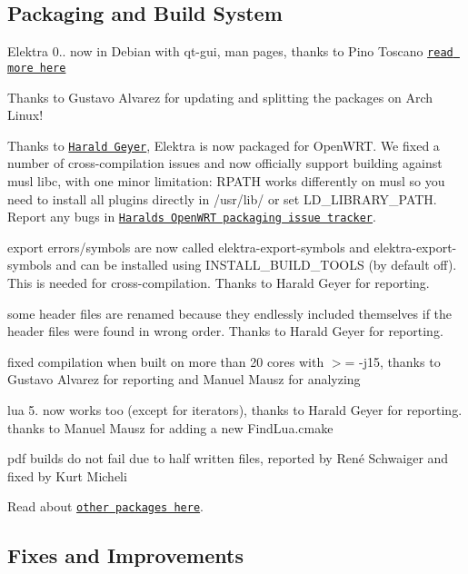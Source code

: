 \subsection*{Packaging and Build System}

Elektra 0.. now in Debian with qt-\/gui, man pages, thanks to Pino Toscano \href{https://packages.qa.debian.org/e/elektra/news/20151215T000031Z.html}{\tt read more here}

Thanks to Gustavo Alvarez for updating and splitting the packages on Arch Linux!

Thanks to \href{http://friends.ccbib.org/harald/supporting/}{\tt Harald Geyer}, Elektra is now packaged for Open\+W\+RT. We fixed a number of cross-\/compilation issues and now officially support building against musl libc, with one minor limitation\+: R\+P\+A\+TH works differently on musl so you need to install all plugins directly in /usr/lib/ or set L\+D\+\_\+\+L\+I\+B\+R\+A\+R\+Y\+\_\+\+P\+A\+TH. Report any bugs in \href{https://github.com/haraldg/packages}{\tt Harald\textquotesingle{}s Open\+W\+RT packaging issue tracker}.


\begin{DoxyItemize}
\item export errors/symbols are now called {\ttfamily elektra-\/export-\/symbols} and {\ttfamily elektra-\/export-\/symbols} and can be installed using {\ttfamily I\+N\+S\+T\+A\+L\+L\+\_\+\+B\+U\+I\+L\+D\+\_\+\+T\+O\+O\+LS} (by default off). This is needed for cross-\/compilation. Thanks to Harald Geyer for reporting.
\item some header files are renamed because they endlessly included themselves if the header files were found in wrong order. Thanks to Harald Geyer for reporting.
\item fixed compilation when built on more than 20 cores with $>$= -\/j15, thanks to Gustavo Alvarez for reporting and Manuel Mausz for analyzing
\item lua 5. now works too (except for iterators), thanks to Harald Geyer for reporting. thanks to Manuel Mausz for adding a new Find\+Lua.\+cmake
\item pdf builds do not fail due to half written files, reported by René Schwaiger and fixed by Kurt Micheli
\end{DoxyItemize}

Read about \href{https://github.com/ElektraInitiative/libelektra#packages}{\tt other packages here}.

\subsection*{Fixes and Improvements}


